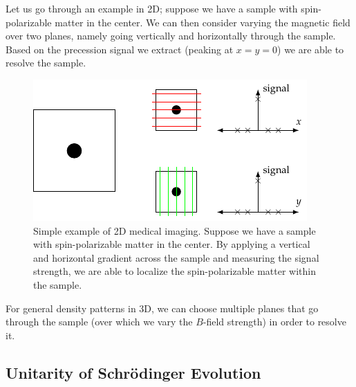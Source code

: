 Let us go through an example in 2D; suppose we have a sample with spin-polarizable matter in the center. We can then consider varying the magnetic field over two planes, namely going vertically and horizontally through the sample. Based on the precession signal we extract (peaking at $x = y = 0$) we are able to resolve the sample.

\begin{figure}[htbp]
    \centering
    \includegraphics{Images/fig-2DBgradient.pdf}
    
    \caption{Simple example of 2D medical imaging. Suppose we have a sample with spin-polarizable matter in the center. By applying a vertical and horizontal gradient across the sample and measuring the signal strength, we are able to localize the spin-polarizable matter within the sample.}
    \label{fig-2DBgradient}
\end{figure}

For general density patterns in 3D, we can choose multiple planes that go through the sample (over which we vary the $B$-field strength) in order to resolve it.

\subsection{Unitarity of Schr\"{o}dinger Evolution}

